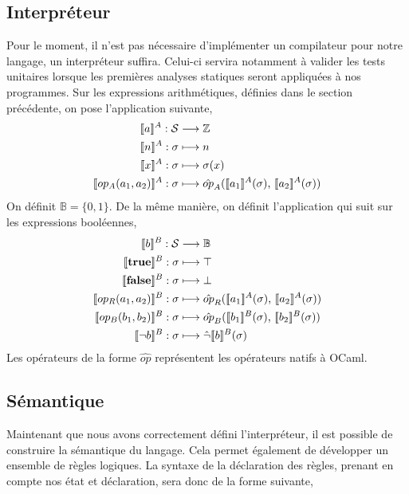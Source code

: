 \documentclass[a4paper, 10pt]{article}
\begin{document}
\subsection{Interpréteur}
Pour le moment, il n'est pas nécessaire d'implémenter un compilateur pour notre langage, un interpréteur suffira.
Celui-ci servira notamment à valider les tests unitaires lorsque les premières analyses statiques seront appliquées
à nos programmes.
Sur les expressions arithmétiques, définies dans le section précédente, on pose l'application suivante,
\begin{align*}
	\intrfun{\arithexp}{A}:\mathcal{S}&\longrightarrow\mathbb{Z}\\
	\intrfun{n}{A}:\sigma&\longmapsto n\\
	\intrfun{x}{A}:\sigma&\longmapsto\sigma(x)\\
	\intrfun{op_A(a_1, a_2)}{A}:\sigma&\longmapsto\hat{op}_A(\intr{a_1}{A}{\sigma}\text{, }\intr{a_2}{A}{\sigma})\\
\end{align*}
On définit $\mathbb{B} = \{0, 1\}$. De la même manière, on définit l'application qui suit sur les expressions booléennes,
\begin{align*}
	\intrfun{\boolexp}{B}:\mathcal{S}&\longrightarrow\mathbb{B}\\	
	\intrfun{\textbf{true}}{B}:\sigma&\longmapsto\top\\
	\intrfun{\textbf{false}}{B}:\sigma&\longmapsto\bot\\
	\intrfun{op_R(a_1, a_2)}{B}:\sigma &\longmapsto \hat{op}_R(\intr{a_1}{A}{\sigma}\text{, }\intr{a_2}{A}{\sigma})\\
	\intrfun{op_B(b_1, b_2)}{B}:\sigma&\longmapsto \hat{op}_B(\intr{b_1}{B}{\sigma}\text{, }\intr{b_2}{B}{\sigma})\\
	\intrfun{\neg b}{B}:\sigma&\longmapsto\hat{\neg}\intr{b}{B}{\sigma}
\end{align*}
Les opérateurs de la forme $\hat{op}$ représentent les opérateurs natifs à OCaml.

\subsection{Sémantique}
Maintenant que nous avons correctement défini l'interpréteur, il est possible 
de construire la sémantique du langage. Cela permet également de développer 
un ensemble de règles logiques. La syntaxe de la déclaration des règles,
prenant en compte nos état et déclaration, sera donc de la forme suivante,
\end{document}
